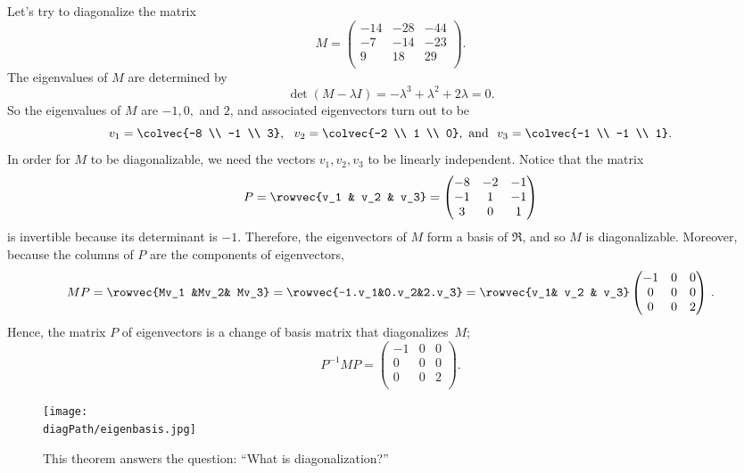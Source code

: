 \begin{example}
Let's try to diagonalize the matrix
\[M=\begin{pmatrix}
-14 & -28 & -44 \\
-7 & -14 & -23 \\
9 & 18 & 29 \\
\end{pmatrix}.\]
The eigenvalues of \(M\) are determined by \[\det(M-\lambda I)=-\lambda^3+\lambda^2+2\lambda=0.\]
So the eigenvalues of \(M\) are \(-1,0,\) and \(2\), and associated eigenvectors turn out to be 
\[
v_1=\colvec{-8 \\ -1 \\ 3},~~ v_2=\colvec{-2 \\ 1 \\ 0}, \text{~and~~} v_3=\colvec{-1 \\ -1 \\ 1}.
\] 
In order for \(M\) to be diagonalizable, we need the vectors \(v_1, v_2, v_3\) to be linearly independent. Notice that the matrix
\[P=\rowvec{v_1 & v_2 & v_3}=\begin{pmatrix}
-8 & -2 & -1 \\
-1 & 1 & -1 \\
3 & 0 & 1 \\
\end{pmatrix}\]
is invertible because its determinant is \(-1\). Therefore, the eigenvectors of \(M\) form a basis of \(\Re\), and so \(M\) is diagonalizable. 
Moreover, because the columns of $P$ are the components of eigenvectors, 
\[
MP=\rowvec{Mv_1 &Mv_2& Mv_3}=\rowvec{-1.v_1&0.v_2&2.v_3}=\rowvec{v_1& v_2 & v_3}\begin{pmatrix}
-1 & 0 & 0 \\
0 & 0 & 0 \\
0 & 0 & 2 \\
\end{pmatrix}\, .
\]
Hence, the matrix \(P\) of eigenvectors is a change of basis matrix that diagonalizes~\(M\);
\[P^{-1}MP=\begin{pmatrix}
-1 & 0 & 0 \\
0 & 0 & 0 \\
0 & 0 & 2 \\
\end{pmatrix}.\]
\end{example}


\begin{figure}
\begin{center}
\texttt{[image: \\diagPath/eigenbasis.jpg]}
\end{center}
\caption{This theorem answers the question: ``What is diagonalization?''}
\end{figure}

